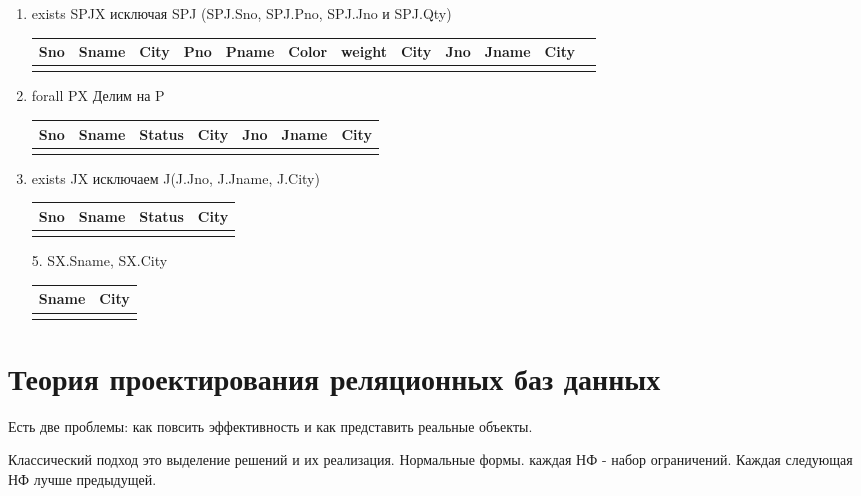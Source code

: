 \documentclass[a4paper, 14pt]{report}
\begin{document}
\begin{enumerate}
    \item exists SPJX исключая SPJ (SPJ.Sno, SPJ.Pno, SPJ.Jno и SPJ.Qty)

        \begin{tabular}{|c|c|c|c|c|c|c|c|c|c|c|c|}
            \hline
            Sno & Sname & City & Pno & Pname & Color & weight & City & Jno & Jname & City \\
            \hline
                & & & & & & & & & & \\
        \end{tabular}

    \item forall PX Делим на P

        \begin{tabular}{|c|c|c|c|c|c|c|}
            \hline
            Sno & Sname & Status & City & Jno & Jname & City \\
            \hline
                & & & & & & \\
        \end{tabular}

    \item exists JX исключаем J(J.Jno, J.Jname, J.City)

        \begin{tabular}{|c|c|c|c|}
            \hline
            Sno & Sname & Status & City \\
            \hline
                & & & \\
        \end{tabular}

    \item[5.] SX.Sname, SX.City

        \begin{tabular}{|c|c|}
            \hline
            Sname & City \\
            \hline
                  & \\
        \end{tabular}
\end{enumerate}

\chapter{Теория проектирования реляционных баз данных}

Есть две проблемы: как повсить эффективность и как представить реальные объекты.

Классический подход это выделение решений и их реализация. Нормальные формы. каждая НФ - набор ограничений. Каждая следующая НФ лучше предыдущей.
\end{document}
